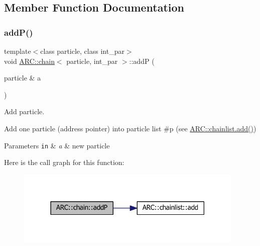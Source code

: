 \subsection{Member Function Documentation}
\hypertarget{classARC_1_1chain_a6af4a9c65329265a45f0210c104fa96a}{}\label{classARC_1_1chain_a6af4a9c65329265a45f0210c104fa96a} 
\subsubsection{\texorpdfstring{add\+P()}{addP()}\hspace{0.1cm}{\footnotesize\ttfamily [1/3]}}
{\footnotesize\ttfamily template$<$class particle, class int\+\_\+par$>$ \\
void \hyperlink{classARC_1_1chain}{A\+R\+C\+::chain}$<$ particle, int\+\_\+par $>$\+::addP (\begin{DoxyParamCaption}\item[{particle \&}]{a }\end{DoxyParamCaption})\hspace{0.3cm}{\ttfamily [inline]}}



Add particle. 

Add one particle (address pointer) into particle list \#p (see \hyperlink{classARC_1_1chainlist_ab04a5742cd27168e0404e57a67d6afd1}{A\+R\+C\+::chainlist.\+add()}) 
\begin{DoxyParams}[1]{Parameters}
\mbox{\tt in}  & {\em a} & new particle \\
\hline
\end{DoxyParams}
Here is the call graph for this function\+:
\nopagebreak
\begin{figure}[H]
\begin{center}
\leavevmode
\includegraphics[width=309pt]{classARC_1_1chain_a6af4a9c65329265a45f0210c104fa96a_cgraph}
\end{center}
\end{figure}
\hypertarget{classARC_1_1chain_abf446295cee9e550c32d64e575f68d04}{}\label{classARC_1_1chain_abf446295cee9e550c32d64e575f68d04} 
